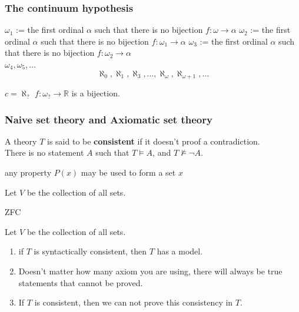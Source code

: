 \documentclass{beamer}
\begin{document}
\begin{frame}
\frametitle{The continuum hypothesis}
$\omega_1$ := the first ordinal $ \alpha$ such that there is no bijection $f:\omega \longrightarrow \alpha$
\pause
$\omega_2$ := the first ordinal $ \alpha$ such that there is no bijection $f:\omega_1 \longrightarrow \alpha$
\pause
$\omega_3$ := the first ordinal $ \alpha$ such that there is no bijection $f:\omega_2 \longrightarrow \alpha$\\
$\omega_4, \omega_5, \dots $
\pause
$$\aleph_0, \aleph_1, \aleph_3, \dots, \aleph_{\omega}, \aleph_{\omega+1}, \dots $$
\begin{block}{$c = \aleph_?$}
$f: \omega_{?} \longrightarrow \mathbb{R}$ is a bijection.
\end{block}
\end{frame}
\begin{frame}
\frametitle{Naive set theory and Axiomatic set theory}
\begin{definition}
A theory $T$ is said to be \textbf{consistent} if it doesn't proof a contradiction.\\
There is no statement $A$ such that $T \vDash A$, and $T \nvDash \neg A$.
\end{definition}
\pause
\begin{center}
{\Large  any property $P(x)$ may be used to form a set $x$}
\end{center}
\pause
\begin{center}
{\Large Let $V$ be the collection of all sets.}
\end{center}
\end{frame}
\begin{frame}
\begin{center}
{\Huge ZFC}
\end{center}
\pause
\begin{center}
{\Large Let $V$ be the collection of all sets.}
\end{center}
\pause
\begin{theorem}
\begin{enumerate}
\item if $T$ is syntactically consistent, then $T$ has a model.
\pause
\item Doesn't matter how many axiom you are using, there will always be true statements that cannot be proved.
\pause
\item If $T$ is consistent, then we can not prove this consistency in $T$.
\end{enumerate}
\end{theorem}
\end{frame}
\end{document}
